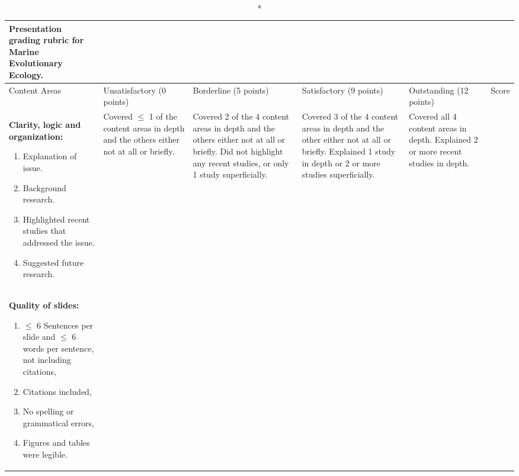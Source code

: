 \documentclass[10pt]{article}
\begin{document}
\begin{landscape}
{\small%
\begin{longtable}[l]{@{}L{5cm}L{3.5cm}L{3.5cm}L{3.5cm}L{3.5cm}L{1.9cm}@{}}
\caption*{\textbf{Presentation grading rubric for Marine Evolutionary Ecology.}}\\
\toprule
Content Areas & Unsatisfactory (0 points) & Borderline (5 points) & Satisfactory (9 points) & Outstanding (12 points) & Score \\ 
\midrule
\endhead
\textbf{Clarity, logic  and organization:}\par%
\vspace{-0.5\baselineskip}
\begin{enumerate}[itemsep=-0.25\baselineskip,align=left, leftmargin=*]
\item Explanation of issue.
\item Background research.
\item Highlighted recent studies that addressed the issue.
\item Suggested future research.
\end{enumerate}&%
Covered $\leq$ 1 of the content areas in depth and the others either not at all or briefly. &%
Covered 2 of the 4 content areas in depth and the others either not at all or briefly. Did not highlight any recent studies, or only 1 study superficially. &%
Covered 3 of the 4 content areas in depth and the other either not at all or briefly.  Explained 1 study in depth or 2 or more studies superficially. &%
Covered all 4 content  areas in depth. Explained 2 or more recent studies in depth.&%
\\[-1em]
\midrule
\textbf{Quality of slides:}\par%
\vspace{-0.5\baselineskip}
\begin{enumerate}[itemsep=-0.25\baselineskip,align=left, leftmargin=*]
\item $\leq$ 6 Sentences per slide and $\leq$ 6 words per sentence, not including citations, %
\item Citations included, \par%
\item No spelling or grammatical errors,\par%
\item Figures and tables were legible.

\end{enumerate}
\end{longtable}}
\end{landscape}
\end{document}
